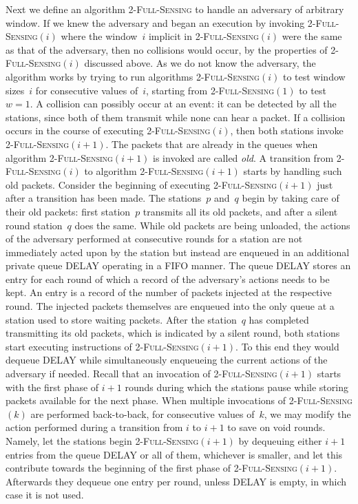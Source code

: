 \documentclass[11pt]{article}
\begin{document}
Next we define an algorithm \textsc{2-Full-Sensing} to handle an adversary of arbitrary window.
If we knew the adversary and began an execution by invoking \textsc{2-Full-Sensing$(i)$} where the window~$i$ implicit in \textsc{2-Full-Sensing$(i)$} were the same as that of the adversary, then no collisions would occur, by the properties of \textsc{2-Full-Sensing$(i)$} discussed above.
As we do not know the adversary, the algorithm works by trying to run algorithms \textsc{2-Full-Sensing$(i)$} to test window sizes~$i$ for consecutive values of~$i$, starting from \textsc{2-Full-Sensing$(1)$} to test $w=1$.
A collision can possibly occur at an event: it can be detected by all the stations, since both of them transmit while none can hear a packet.
If a collision occurs in the course of executing \textsc{2-Full-Sensing$(i)$}, then both stations invoke \textsc{2-Full-Sensing$(i+1)$}.
The packets that are already in the queues when algorithm \textsc{2-Full-Sensing$(i+1)$} is invoked are called \emph{old}.
A transition from  \textsc{2-Full-Sensing$(i)$}  to algorithm \textsc{2-Full-Sensing$(i+1)$} starts by handling such old packets.
Consider the beginning of executing \textsc{2-Full-Sensing$(i+1)$} just after a transition has been made.
The stations~$p$ and~$q$ begin by taking care of their old packets: first station~$p$ transmits all its old packets, and after a silent round station~$q$ does the same.
While old packets are being unloaded, the actions of the adversary performed at consecutive rounds for a station are not immediately acted upon by the station but instead are enqueued in an additional private queue DELAY operating in a FIFO manner.
The queue DELAY stores an entry for each round of which a record of the adversary's actions  needs to be kept. 
An entry is a record of the number of packets injected at the respective round. 
The injected packets themselves are enqueued into the only queue at a station used to store waiting packets.
After the station~$q$ has completed transmitting its old packets, which is indicated by a silent round, both stations start executing instructions of \textsc{2-Full-Sensing$(i+1)$}.
To this end they would dequeue DELAY while simultaneously enqueueing the current actions of the adversary if needed.
Recall that an invocation of \textsc{2-Full-Sensing$(i+1)$} starts with the first phase of $i+1$ rounds during which the stations pause while storing packets available for the next phase.
When multiple invocations of \textsc{2-Full-Sensing$(k)$} are performed back-to-back, for consecutive values of~$k$, we may modify the action performed during a transition from $i$ to $i+1$ to save on void rounds. 
Namely, let the stations begin \textsc{2-Full-Sensing$(i+1)$} by dequeuing either $i+1$ entries from the queue DELAY or all of them, whichever is smaller, and let this contribute towards the beginning of the first phase of \textsc{2-Full-Sensing$(i+1)$}.
Afterwards they dequeue one entry per round, unless DELAY is empty, in which case it is not used.
\end{document}
